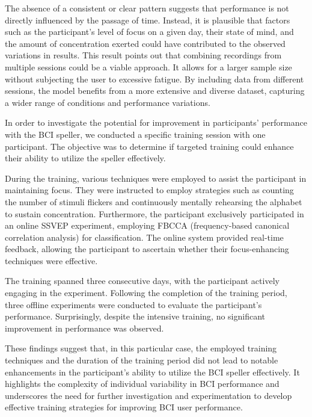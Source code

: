 The absence of a consistent or clear pattern suggests that performance is not directly influenced by the passage of time. Instead, it is plausible that factors such as the participant's level of focus on a given day, their state of mind, and the amount of concentration exerted could have contributed to the observed variations in results. This result points out that combining recordings from multiple sessions could be a viable approach. It allows for a larger sample size without subjecting the user to excessive fatigue. By including data from different sessions, the model benefits from a more extensive and diverse dataset, capturing a wider range of conditions and performance variations.

In order to investigate the potential for improvement in participants' performance with the BCI speller, we conducted a specific training session with one participant. The objective was to determine if targeted training could enhance their ability to utilize the speller effectively.

During the training, various techniques were employed to assist the participant in maintaining focus. They were instructed to employ strategies such as counting the number of stimuli flickers and continuously mentally rehearsing the alphabet to sustain concentration. Furthermore, the participant exclusively participated in an online SSVEP experiment, employing FBCCA (frequency-based canonical correlation analysis) for classification. The online system provided real-time feedback, allowing the participant to ascertain whether their focus-enhancing techniques were effective.

The training spanned three consecutive days, with the participant actively engaging in the experiment. Following the completion of the training period, three offline experiments were conducted to evaluate the participant's performance. Surprisingly, despite the intensive training, no significant improvement in performance was observed.

These findings suggest that, in this particular case, the employed training techniques and the duration of the training period did not lead to notable enhancements in the participant's ability to utilize the BCI speller effectively. It highlights the complexity of individual variability in BCI performance and underscores the need for further investigation and experimentation to develop effective training strategies for improving BCI user performance. 


